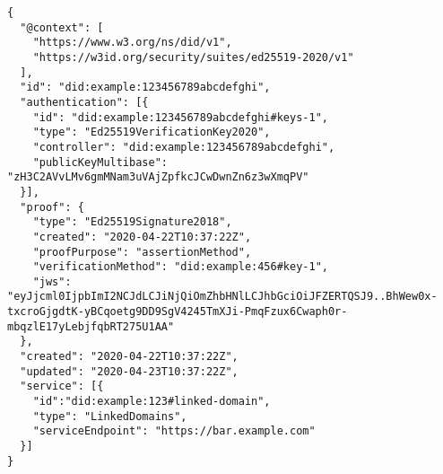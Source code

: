 \label{code:did-doc}
\begin{verbatim}
{
  "@context": [
    "https://www.w3.org/ns/did/v1",
    "https://w3id.org/security/suites/ed25519-2020/v1"
  ],
  "id": "did:example:123456789abcdefghi",
  "authentication": [{
    "id": "did:example:123456789abcdefghi#keys-1",
    "type": "Ed25519VerificationKey2020",
    "controller": "did:example:123456789abcdefghi",
    "publicKeyMultibase": "zH3C2AVvLMv6gmMNam3uVAjZpfkcJCwDwnZn6z3wXmqPV"
  }],
  "proof": {
    "type": "Ed25519Signature2018",
    "created": "2020-04-22T10:37:22Z",
    "proofPurpose": "assertionMethod",
    "verificationMethod": "did:example:456#key-1",
    "jws": "eyJjcml0IjpbImI2NCJdLCJiNjQiOmZhbHNlLCJhbGciOiJFZERTQSJ9..BhWew0x-txcroGjgdtK-yBCqoetg9DD9SgV4245TmXJi-PmqFzux6Cwaph0r-mbqzlE17yLebjfqbRT275U1AA"
  },
  "created": "2020-04-22T10:37:22Z",
  "updated": "2020-04-23T10:37:22Z",
  "service": [{
    "id":"did:example:123#linked-domain",
    "type": "LinkedDomains",
    "serviceEndpoint": "https://bar.example.com"
  }]
}
\end{verbatim}
